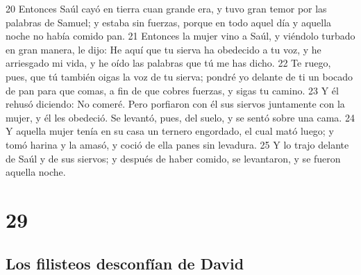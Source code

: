 {20 Entonces Saúl cayó en tierra cuan grande era, y tuvo gran temor por las palabras de Samuel; y estaba sin fuerzas, porque en todo aquel día y aquella noche no había comido pan.
21 Entonces la mujer vino a Saúl, y viéndolo turbado en gran manera, le dijo: He aquí que tu sierva ha obedecido a tu voz, y he arriesgado mi vida, y he oído las palabras que tú me has dicho.
22 Te ruego, pues, que tú también oigas la voz de tu sierva; pondré yo delante de ti un bocado de pan para que comas, a fin de que cobres fuerzas, y sigas tu camino.
23 Y él rehusó diciendo: No comeré. Pero porfiaron con él sus siervos juntamente con la mujer, y él les obedeció. Se levantó, pues, del suelo, y se sentó sobre una cama.
24 Y aquella mujer tenía en su casa un ternero engordado, el cual mató luego; y tomó harina y la amasó, y coció de ella panes sin levadura. 
25 Y lo trajo delante de Saúl y de sus siervos; y después de haber comido, se levantaron, y se fueron aquella noche.

\chapter{29}

\section*{Los filisteos desconfían de David}

}
